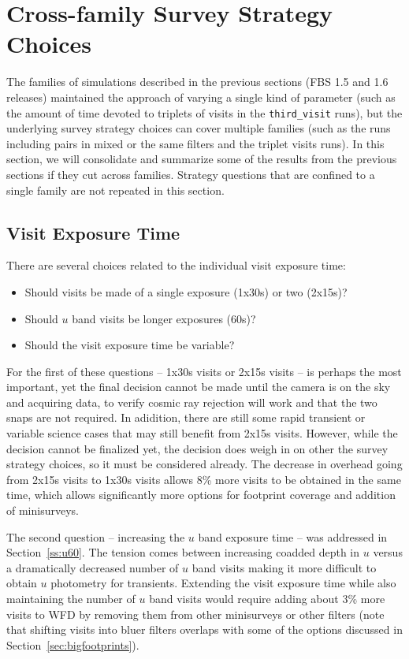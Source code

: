\section{Cross-family Survey Strategy Choices}

The families of simulations described in the previous sections (FBS 1.5 and 1.6 releases) maintained the approach of varying a single kind of parameter (such as the amount of time devoted to triplets of visits in the {\tt third\_visit} runs), but the underlying survey strategy choices can cover multiple families (such as the runs including pairs in mixed or the same filters and the triplet visits runs). In this section, we will consolidate and summarize some of the results from the previous sections if they cut across families. Strategy questions that are confined to a single family are not repeated in this section.

\subsection{Visit Exposure Time}\label{sec:visitexposuretime}

There are several choices related to the individual visit exposure time:
 \begin{itemize}
 \item Should visits be made of a single exposure (1x30s) or two (2x15s)? 
 \item Should $u$ band visits be longer exposures (60s)?
 \item Should the visit exposure time be variable?
 \end{itemize}
 
For the first of these questions -- 1x30s visits or 2x15s visits -- is perhaps the most important, yet the final decision cannot be made until the camera is on the sky and acquiring data, to verify cosmic ray rejection will work and that the two snaps are not required. In adidition, there are still some rapid transient or variable science cases that may still benefit from 2x15s visits. However, while the decision cannot be finalized yet, the decision does weigh in on other the survey strategy choices, so it must be considered already. The decrease in overhead going from 2x15s visits to 1x30s visits allows 8\% more visits to be obtained in the same time, which allows significantly more options for footprint coverage and addition of minisurveys. 

The second question -- increasing the $u$ band exposure time -- was addressed in Section~\ref{ss:u60}. The tension comes between increasing coadded depth in $u$ versus a dramatically decreased number of $u$ band visits making it more difficult to obtain $u$ photometry for transients. Extending the visit exposure time while also maintaining the number of $u$ band visits would require adding about 3\% more visits to WFD by removing them from other minisurveys or other filters (note that shifting visits into bluer filters overlaps with some of the options discussed in Section~\ref{sec:bigfootprints}). 

